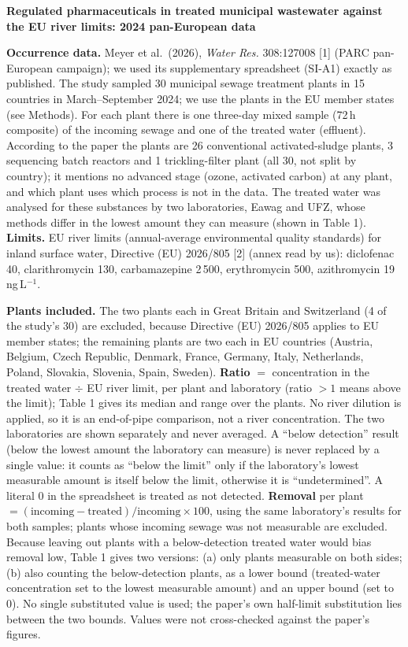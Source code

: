 \documentclass[10pt,a4paper]{article}
\newcommand{\ngL}{ng\,L$^{-1}$}
\newcommand{\sect}[1]{\vspace{2pt}{\large\bfseries #1}\par\vspace{-1pt}}
\begin{document}
{\Large\bfseries Regulated pharmaceuticals in treated municipal wastewater against the EU river limits: 2024 pan-European data}\par

\sect{1\quad Data sources}
\textbf{Occurrence data.} Meyer et al.\ (2026), \emph{Water Res.} 308:127008 [1] (PARC pan-European campaign); we used its supplementary spreadsheet (SI-A1) exactly as published. The study sampled 30 municipal sewage treatment plants in 15 countries in March--September 2024; we use the \Nplants{} plants in the \Nctry{} EU member states (see Methods). For each plant there is one three-day mixed sample (72\,h composite) of the incoming sewage and one of the treated water (effluent). According to the paper the plants are 26 conventional activated-sludge plants, 3 sequencing batch reactors and 1 trickling-filter plant (all 30, not split by country); it mentions no advanced stage (ozone, activated carbon) at any plant, and which plant uses which process is not in the data. The treated water was analysed for these substances by two laboratories, Eawag and UFZ, whose methods differ in the lowest amount they can measure (shown in Table 1). \textbf{Limits.} EU river limits (annual-average environmental quality standards) for inland surface water, Directive (EU) 2026/805 [2] (annex read by us): diclofenac 40, clarithromycin 130, carbamazepine 2\,500, erythromycin 500, azithromycin 19\,\ngL.

\sect{2\quad Methods}
\textbf{Plants included.} The two plants each in Great Britain and Switzerland (4 of the study's 30) are excluded, because Directive (EU) 2026/805 applies to EU member states; the remaining \Nplants{} plants are two each in \Nctry{} EU countries (Austria, Belgium, Czech Republic, Denmark, France, Germany, Italy, Netherlands, Poland, Slovakia, Slovenia, Spain, Sweden). \textbf{Ratio} $=$ concentration in the treated water $\div$ EU river limit, per plant and laboratory (ratio $>1$ means above the limit); Table 1 gives its median and range over the plants. No river dilution is applied, so it is an end-of-pipe comparison, not a river concentration. The two laboratories are shown separately and never averaged. A ``below detection'' result (below the lowest amount the laboratory can measure) is never replaced by a single value: it counts as ``below the limit'' only if the laboratory's lowest measurable amount is itself below the limit, otherwise it is ``undetermined''. A literal 0 in the spreadsheet is treated as not detected. \textbf{Removal} per plant $=(\mathrm{incoming}-\mathrm{treated})/\mathrm{incoming}\times 100$, using the same laboratory's results for both samples; plants whose incoming sewage was not measurable are excluded. Because leaving out plants with a below-detection treated water would bias removal low, Table 1 gives two versions: (a) only plants measurable on both sides; (b) also counting the below-detection plants, as a lower bound (treated-water concentration set to the lowest measurable amount) and an upper bound (set to 0). No single substituted value is used; the paper's own half-limit substitution lies between the two bounds. Values were not cross-checked against the paper's figures.
\end{document}
